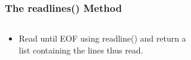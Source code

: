 \documentclass{../py-lecture}
\begin{document}
\begin{frame}[fragile]
	\frametitle{The readlines() Method}
	\begin{columns}[c]
		\begin{column}{30cm}
			\vspace{.1cm}
			\begin{itemize}
				\item Read until EOF using readline() and return a \\
				 list containing the lines thus read.
			\end{itemize}
		\end{column}
	\end{columns}
\end{frame}
\end{document}
